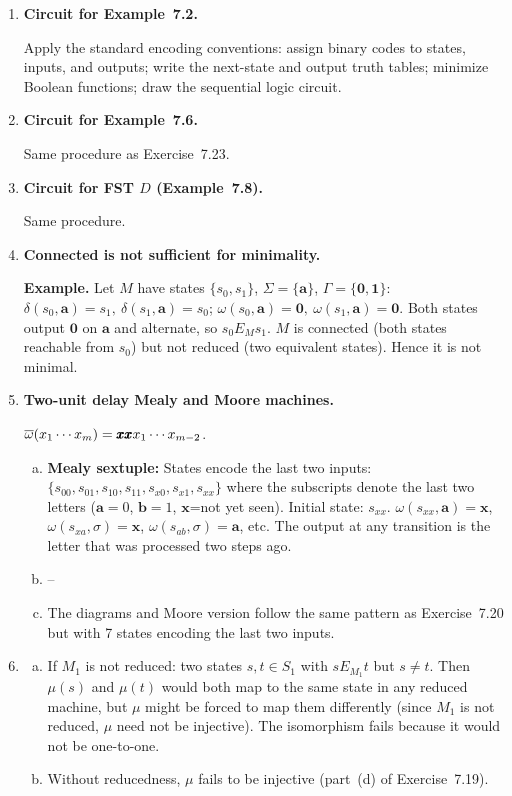 \begin{enumerate}[{7.}1.]
\item \textbf{Circuit for Example~7.2.}

Apply the standard encoding conventions: assign binary codes to states, inputs, and outputs; write the next-state and output truth tables; minimize Boolean functions; draw the sequential logic circuit.

\item \textbf{Circuit for Example~7.6.}

Same procedure as Exercise~7.23.

\item \textbf{Circuit for FST $D$ (Example~7.8).}

Same procedure.

\item \textbf{Connected is not sufficient for minimality.}

\textbf{Example.}  Let $M$ have states $\{s_0,s_1\}$, $\Sigma=\{\pmb{a}\}$, $\Gamma=\{\pmb{0},\pmb{1}\}$:
$\delta(s_0,\pmb{a})=s_1,\ \delta(s_1,\pmb{a})=s_0$; $\omega(s_0,\pmb{a})=\pmb{0},\ \omega(s_1,\pmb{a})=\pmb{0}$.
Both states output $\pmb{0}$ on $\pmb{a}$ and alternate, so $s_0 E_M s_1$.  $M$ is connected (both states reachable from $s_0$) but not reduced (two equivalent states).  Hence it is not minimal.

\item \textbf{Two-unit delay Mealy and Moore machines.}

$\overline{\omega}(x_1\cdots x_m)=\pmb{xx}x_1\cdots x_{m-2}$.

\begin{enumerate}[(a)]
  \item \textbf{Mealy sextuple:}  States encode the last two inputs: $\{s_{00},s_{01},s_{10},s_{11},s_{x0},s_{x1},s_{xx}\}$ where the subscripts denote the last two letters ($\pmb{a}=0$, $\pmb{b}=1$, $\pmb{x}$=not yet seen).
  Initial state: $s_{xx}$.
  $\omega(s_{xx},\pmb{a})=\pmb{x}$, $\omega(s_{xa},\sigma)=\pmb{x}$, $\omega(s_{ab},\sigma)=\pmb{a}$, etc.
  The output at any transition is the letter that was processed two steps ago.

  \item--\item[d.] The diagrams and Moore version follow the same pattern as Exercise~7.20 but with 7 states encoding the last two inputs.
\end{enumerate}

\item \begin{enumerate}[(a)]
  \item If $M_1$ is not reduced: two states $s,t\in S_1$ with $s E_{M_1} t$ but $s\neq t$.  Then $\mu(s)$ and $\mu(t)$ would both map to the same state in any reduced machine, but $\mu$ might be forced to map them differently (since $M_1$ is not reduced, $\mu$ need not be injective).  The isomorphism fails because it would not be one-to-one.
  \item Without reducedness, $\mu$ fails to be injective (part~(d) of Exercise~7.19).
\end{enumerate}


\end{enumerate}
